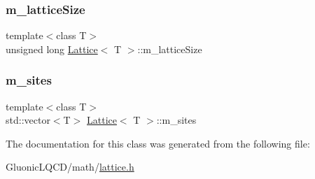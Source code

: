 \mbox{\label{class_lattice_a933045fb4a76f62d29472e6061ed8a34}} 
\subsubsection{\texorpdfstring{m\_latticeSize}{m\_latticeSize}}
{\footnotesize\ttfamily template$<$class T$>$ \\
unsigned long \mbox{\hyperlink{class_lattice}{Lattice}}$<$ T $>$\+::m\+\_\+lattice\+Size}

\mbox{\label{class_lattice_a605a93a5b2a973811f7cff44a8ab84f7}} 
\subsubsection{\texorpdfstring{m\_sites}{m\_sites}}
{\footnotesize\ttfamily template$<$class T$>$ \\
std\+::vector$<$T$>$ \mbox{\hyperlink{class_lattice}{Lattice}}$<$ T $>$\+::m\+\_\+sites}



The documentation for this class was generated from the following file\+:\begin{DoxyCompactItemize}
\item 
Gluonic\+L\+Q\+C\+D/math/\mbox{\hyperlink{lattice_8h}{lattice.\+h}}\end{DoxyCompactItemize}
